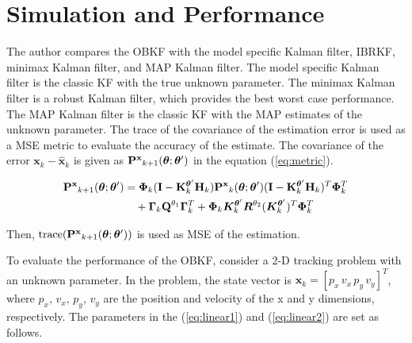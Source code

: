 \section{Simulation and Performance}\label{sec:performance}

The author compares the OBKF with the model specific Kalman filter, IBRKF, minimax Kalman filter, and MAP Kalman filter. The model specific Kalman filter is the classic KF with the true unknown parameter. The minimax Kalman filter is a robust Kalman filter, which provides the best worst case performance. The MAP Kalman filter is the classic KF with the MAP estimates of the unknown parameter. 
The trace of the covariance of the estimation error is used as a MSE metric to evaluate the accuracy of the estimate. The covariance of the error $\bm{x}_k-\bm{\hat x}_k$ is given as ${\bf P^x}_{k+1}(\bm{\theta};\bm{\theta}')$ in the equation (\ref{eq:metric}). 

\begin{align}\label{eq:metric}
{\bf P^x}_{k+1}(\bm{\theta};\bm{\theta}') &= \bm{\Phi}_k({\bf I}-{\bf K}^{\bm{\theta}'}_k{\bf H}_k){\bf P^x}_k(\bm{\theta};\bm{\theta}')({\bf I}-{\bf K}^{\bm{\theta}'}_k{\bf H}_k)^T\bm{\Phi}^T_k \nonumber \\
&\quad + \bm{\Gamma}_k{\bf Q}^{\theta_1}\bm{\Gamma}_k^T + \bm{\Phi}_k\bm{K}_k^{\bm{\theta}'}\bm{R}^{\theta_2}(\bm{K}_k^{\bm{\theta}'})^T\bm{\Phi}_k^T
\end{align}

Then, ${\rm trace}({\bf P^x}_{k+1}(\bm{\theta};\bm{\theta}'))$ is used as MSE of the estimation.

To evaluate the performance of the OBKF, consider a 2-D tracking problem with an unknown parameter. In the problem, the state vector is $\bm{x}_k=[p_x\, v_x\, p_y\, v_y]^T$, where $p_x,\, v_x,\, p_y,\, v_y$ are the position and velocity of the x and y dimensions, respectively. The parameters in the (\ref{eq:linear1}) and (\ref{eq:linear2}) are set as follows.

